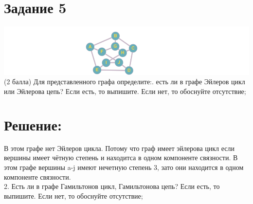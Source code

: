 \documentclass[a4paper,11pt]{article}
\theoremstyle{mytheor}
\begin{document}
\section*{Задание 5}
\includegraphics[width=\textwidth,height=\textheight,keepaspectratio]{image.png} \newline
(2 балла) Для представленного графа определите:. есть ли в графе Эйлеров цикл или Эйлерова цепь? Если
есть, то выпишите. Если нет, то обоснуйте отсутствие;
\newline

\section*{Решение:}
\newline
\large{В этом графе нет Эйлеров цикла. Потому что граф имеет эйлерова
цикл если вершины имеет чётную степень и находитса в одном компоненте связности. В этом графе вершины a-j имеют нечетную степень 3, зато они находится в одном компоненте связности.}
\newline
{}
\newline \\
2. Есть ли в графе Гамильтонов цикл, Гамильтонова цепь?
Если есть, то выпишите. Если нет, то обоснуйте отсутствие;
\newline
\end{document}

